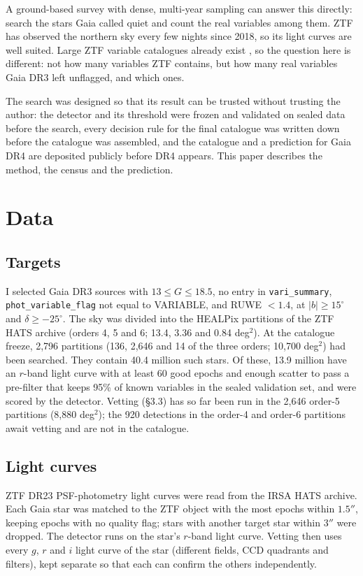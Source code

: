 \documentclass[twocolumn]{searchchev_preprint}
\begin{document}
A ground-based survey with dense, multi-year sampling can answer this directly: search the stars Gaia called quiet
and count the real variables among them. ZTF \citep{Bellm2019,Masci2019} has observed the northern sky every few
nights since 2018, so its light curves are well suited. Large ZTF variable catalogues already exist
\citep{Chen2020,Ofek2020,Healy2024}, so the question here is different: not how many variables ZTF contains, but
how many real variables Gaia DR3 left unflagged, and which ones.

The search was designed so that its result can be trusted without trusting the author: the detector and its threshold
were frozen and validated on sealed data before the search, every decision rule for the final catalogue was written
down before the catalogue was assembled, and the catalogue and a prediction for Gaia DR4 are deposited publicly
before DR4 appears. This paper describes the method, the census and the prediction.

\section{Data}
\subsection{Targets}
I selected Gaia DR3 sources with $13\le G\le18.5$, no entry in \texttt{vari\_summary},
\texttt{phot\_variable\_flag} not equal to VARIABLE, and RUWE $<1.4$, at $|b|\ge15^\circ$ and $\delta\ge-25^\circ$. The
sky was divided into the HEALPix partitions of the ZTF HATS archive (orders 4, 5 and 6; 13.4, 3.36 and 0.84 deg$^2$).
At the catalogue freeze, 2,796 partitions (136, 2,646 and 14 of the three orders; 10,700 deg$^2$) had been searched.
They contain 40.4 million such stars. Of these, 13.9 million have an $r$-band light curve with at least 60 good epochs
and enough scatter to pass a pre-filter that keeps 95\% of known variables in the sealed validation set, and were
scored by the detector. Vetting (\S3.3) has so far been run in the 2,646 order-5 partitions (8,880 deg$^2$); the 920
detections in the order-4 and order-6 partitions await vetting and are not in the catalogue.

\subsection{Light curves}
ZTF DR23 PSF-photometry light curves were read from the IRSA HATS archive. Each Gaia star was matched to the ZTF
object with the most epochs within $1.5''$, keeping epochs with no quality flag; stars with another target star
within $3''$ were dropped. The detector runs on the star's $r$-band light curve.
Vetting then uses every $g$, $r$ and $i$ light curve of the star (different fields, CCD quadrants and filters), kept
separate so that each can confirm the others independently.
\end{document}
